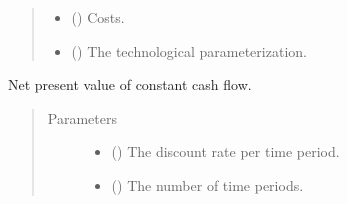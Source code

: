 \documentclass[letterpaper,10pt,english]{sphinxmanual}
\begin{document}
\begin{fulllineitems}
\begin{quote}
\begin{description}
\begin{itemize}
\item {} 
 () \textendash{} Costs.

\item {} 
 () \textendash{} The technological parameterization.

\end{itemize}

\end{description}\end{quote}

\end{fulllineitems}


\begin{fulllineitems}
\label{\detokenize{technology:technology.pv_residential_simple.npv}}
Net present value of constant cash flow.
\begin{quote}\begin{description}
\item[{Parameters}] \leavevmode\begin{itemize}
\item {} 
 () \textendash{} The discount rate per time period.

\item {} 
 () \textendash{} The number of time periods.

\end{itemize}

\end{description}\end{quote}

\end{fulllineitems}

\end{document}
